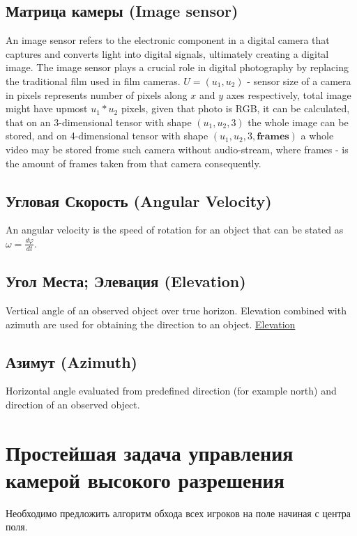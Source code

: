 \subsection{Матрица камеры (Image sensor)}
 An image sensor refers to the electronic component in a digital camera that captures and converts light into digital signals, ultimately creating a digital image. The image sensor plays a crucial role in digital photography by replacing the traditional film used in film cameras. $U=(u_1,u_2)$ - sensor size of a camera in pixels represents number of pixels along $x$ and $y$ axes respectively, total image might have upmost $u_1*u_2$ pixels, given that photo is RGB, it can be calculated, that on an 3-dimensional tensor with shape $(u_1, u_2, 3)$ the whole image can be stored, and on 4-dimensional tensor with shape $(u_1, u_2, 3, \textbf{frames})$ a whole video may be stored frome such camera without audio-stream, where frames - is the amount of frames taken from that camera consequently.



\subsection{Угловая Скорость (Angular Velocity)}
An angular velocity is the speed of rotation for an object that can be stated as ${\displaystyle \omega ={\frac {d\varphi }{dt}}}$.

\subsection{Угол Места; Элевация (Elevation)}
Vertical angle of an observed object over true horizon. Elevation combined with azimuth are used for obtaining the direction to an object. \href{https://ru.wikipedia.org/wiki/%D0%A3%D0%B3%D0%BE%D0%BB_%D0%BC%D0%B5%D1%81%D1%82%D0%B0}{Elevation}

\subsection{Азимут (Azimuth)}
Horizontal angle evaluated from predefined direction (for example north) and direction of an observed object.

\section{Простейшая задача управления камерой высокого разрешения}

Необходимо предложить алгоритм обхода всех игроков на поле начиная с центра поля.

